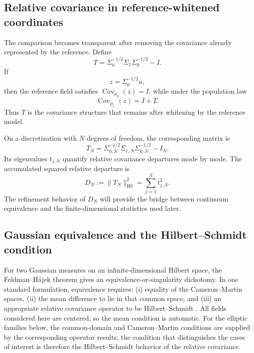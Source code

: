 \documentclass[11pt]{article}
\numberwithin{table}{section}
\numberwithin{figure}{section}
\begin{document}
\subsection{Relative covariance in reference-whitened coordinates}
\label{sec:relative_covariance}

The comparison becomes transparent after removing the covariance already represented by the reference. Define
\begin{equation}
    T
    =
    \Sigma_0^{-1/2}
    \Sigma_1
    \Sigma_0^{-1/2}
    - I .
    \label{eq:T_continuum}
\end{equation}
If
\begin{equation}
    z=\Sigma_0^{-1/2}u,
\end{equation}
then the reference field satisfies $\operatorname{Cov}_{\mu_0}(z)=I$, while under the population law
\begin{equation}
    \operatorname{Cov}_{\mu_1}(z)=I+T.
\end{equation}
Thus $T$ is the covariance structure that remains after whitening by the reference model.

On a discretization with $N$ degrees of freedom, the corresponding matrix is
\begin{equation}
    T_N
    =
    \Sigma_{0,N}^{-1/2}
    \Sigma_{1,N}
    \Sigma_{0,N}^{-1/2}
    - I_N .
    \label{eq:T_discrete}
\end{equation}
Its eigenvalues $t_{j,N}$ quantify relative covariance departures mode by mode. The accumulated squared relative departure is
\begin{equation}
    D_N
    :=
    \|T_N\|_{\mathrm{HS}}^2
    =
    \sum_{j=1}^{N} t_{j,N}^2 .
    \label{eq:Dn}
\end{equation}
The refinement behavior of $D_N$ will provide the bridge between continuum equivalence and the finite-dimensional statistics used later.

\subsection{Gaussian equivalence and the Hilbert--Schmidt condition}
\label{sec:fh}

For two Gaussian measures on an infinite-dimensional Hilbert space, the Feldman--H\'ajek theorem gives an equivalence-or-singularity dichotomy. In one standard formulation, equivalence requires: (i) equality of the Cameron--Martin spaces, (ii) the mean difference to lie in that common space, and (iii) an appropriate relative covariance operator to be Hilbert--Schmidt \citep[Thm.~2.25]{DaPratoZabczyk2014}. All fields considered here are centered, so the mean condition is automatic. For the elliptic families below, the common-domain and Cameron--Martin conditions are supplied by the corresponding operator results; the condition that distinguishes the cases of interest is therefore the Hilbert--Schmidt behavior of the relative covariance.
\end{document}
